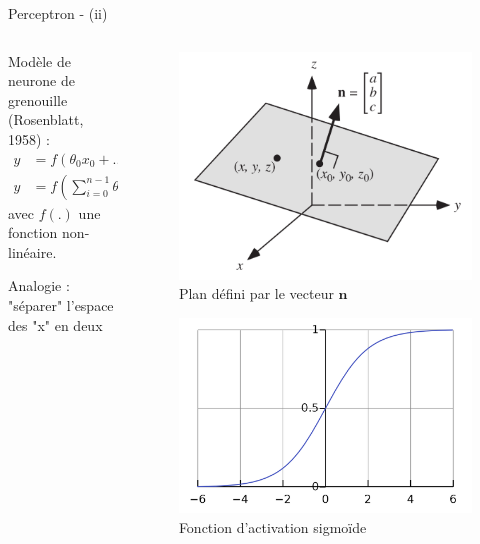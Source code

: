 \documentclass[9pt, aspectratio=169]{beamer}
\begin{document}
\begin{frame}{Perceptron - (ii)} %

\begin{columns}
    \begin{column}{0.6\textwidth}
Modèle de neurone de grenouille (Rosenblatt, 1958) :
\begin{align*}
	y &= f(\theta_0 x_0 + ... + \theta_{n-1} x_{n-1} + b) \\
	y &= f\left( \sum\limits_{i=0}^{n-1}	 \theta_i x_i + b\right)
\end{align*}
avec $f(.)$ une fonction non-linéaire.

Analogie : "séparer" l'espace des "x" en deux

    \end{column}
    \begin{column}{0.38\textwidth}
		\begin{figure}
		\includegraphics[width=.7\linewidth]{fig/plan.png}
		\caption{Plan défini par le vecteur $\textbf{n}$}
		\end{figure}
		\begin{figure}
		\includegraphics[width=.7\linewidth]{fig/sigmoid.png}
		\caption{Fonction d'activation sigmoïde}
		\end{figure}
    \end{column}
\end{columns}

\end{frame}
\end{document}
